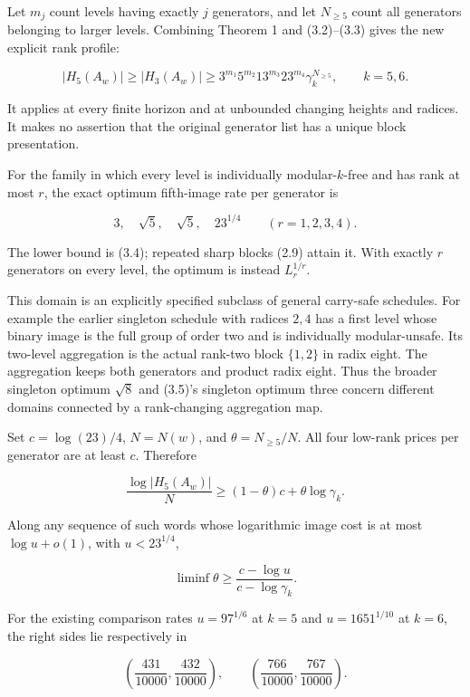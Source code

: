 Let \(m_j\) count levels having exactly \(j\) generators, and let \(N_{\ge5}\) count all generators belonging to larger levels. Combining Theorem 1 and (3.2)--(3.3) gives the new explicit rank profile:

\[
\boxed{
|H_5(A_w)|\ge|H_3(A_w)|
\ge3^{m_1}5^{m_2}13^{m_3}23^{m_4}
\gamma_k^{N_{\ge5}},\qquad k=5,6.
}
\tag{3.4}
\]

It applies at every finite horizon and at unbounded changing heights and radices. It makes no assertion that the original generator list has a unique block presentation.

For the family in which every level is individually modular-\(k\)-free and has rank at most \(r\), the exact optimum fifth-image rate per generator is

\[
\boxed{3,\quad\sqrt5,\quad\sqrt5,\quad23^{1/4}
\qquad(r=1,2,3,4).}
\tag{3.5}
\]

The lower bound is (3.4); repeated sharp blocks (2.9) attain it. With exactly \(r\) generators on every level, the optimum is instead \(L_r^{1/r}\).

This domain is an explicitly specified subclass of general carry-safe schedules. For example the earlier singleton schedule with radices \(2,4\) has a first level whose binary image is the full group of order two and is individually modular-unsafe. Its two-level aggregation is the actual rank-two block \(\{1,2\}\) in radix eight. The aggregation keeps both generators and product radix eight. Thus the broader singleton optimum \(\sqrt8\) and (3.5)'s singleton optimum three concern different domains connected by a rank-changing aggregation map.

Set \(c=\log(23)/4\), \(N=N(w)\), and \(\theta=N_{\ge5}/N\). All four low-rank prices per generator are at least \(c\). Therefore

\[
\boxed{
\frac{\log |H_5(A_w)|}{N}
\ge(1-\theta)c+\theta\log\gamma_k.
}
\tag{3.6}
\]

Along any sequence of such words whose logarithmic image cost is at most \(\log u+o(1)\), with \(u<23^{1/4}\),

\[
\liminf\theta\ge
\frac{c-\log u}{c-\log\gamma_k}.
\tag{3.7}
\]

For the existing comparison rates \(u=97^{1/6}\) at \(k=5\) and \(u=1651^{1/10}\) at \(k=6\), the right sides lie respectively in

\[
\left(\frac{431}{10000},\frac{432}{10000}\right),
\qquad
\left(\frac{766}{10000},\frac{767}{10000}\right).
\tag{3.8}
\]

